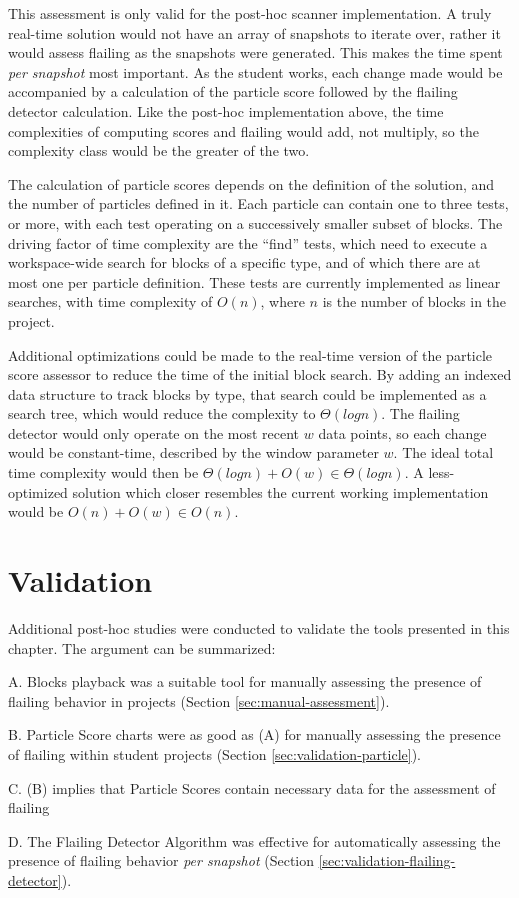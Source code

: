 This assessment is only valid for the post-hoc scanner implementation. A truly real-time solution would not have an array of snapshots to iterate over, rather it would assess flailing as the snapshots were generated. This makes the time spent \emph{per snapshot} most important. As the student works, each change made would be accompanied by a calculation of the particle score followed by the flailing detector calculation. Like the post-hoc implementation above, the time complexities of computing scores and flailing would add, not multiply, so the complexity class would be the greater of the two. 

The calculation of particle scores depends on the definition of the solution, and the number of particles defined in it. Each particle can contain one to three tests, or more, with each test operating on a successively smaller subset of blocks. The driving factor of time complexity are the ``find'' tests, which need to execute a workspace-wide search for blocks of a specific type, and of which there are at most one per particle definition. These tests are currently implemented as linear searches, with time complexity of $O(n)$, where $n$ is the number of blocks in the project. 

Additional optimizations could be made to the real-time version of the particle score assessor to reduce the time of the initial block search. By adding an indexed data structure to track blocks by type, that search could be implemented as a search tree, which would reduce the complexity to $\Theta(logn)$. The flailing detector would only operate on the most recent $w$ data points, so each change would be constant-time, described by the window parameter $w$. The ideal total time complexity would then be $\Theta(logn) + O(w) \in \Theta(logn)$. A less-optimized solution which closer resembles the current working implementation would be $O(n) + O(w) \in O(n)$.



\section{Validation}
Additional post-hoc studies were conducted to validate the tools presented in this chapter. The argument can be summarized:
\begin{description}
\item A. Blocks playback was a suitable tool for manually assessing the presence of flailing behavior in projects (Section \ref{sec:manual-assessment}). 
\item B. Particle Score charts were as good as (A) for manually assessing the presence of flailing within student projects (Section \ref{sec:validation-particle}).
\item C. (B) implies that Particle Scores contain necessary data for the assessment of flailing
\item D. The Flailing Detector Algorithm was effective for automatically assessing the presence of flailing behavior \emph{per snapshot} (Section \ref{sec:validation-flailing-detector}).
\end{description}

